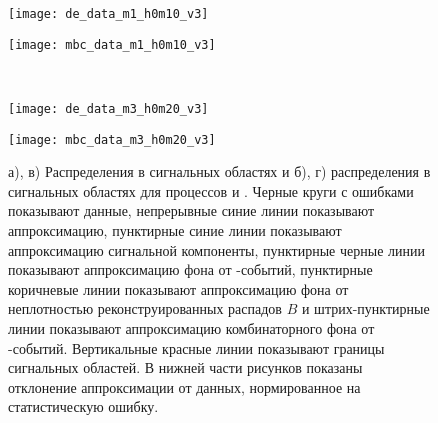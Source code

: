 \begin{figure}[H]
\begin{minipage}[b]{0.5\textwidth}
  \centering
  \texttt{[image: de\_data\_m1\_h0m10\_v3]}
  \subcaption{\bdpi: \de}
\end{minipage}
\begin{minipage}[b]{0.5\textwidth}
  \centering
  \texttt{[image: mbc\_data\_m1\_h0m10\_v3]}
  \subcaption{\bdpi: \mbc}
\end{minipage}
 \\
\begin{minipage}[b]{0.5\textwidth}
  \centering
  \texttt{[image: de\_data\_m3\_h0m20\_v3]}
  \subcaption{\bdomega: \de}
 \end{minipage}
 \begin{minipage}[b]{0.5\textwidth}
  \centering
  \texttt{[image: mbc\_data\_m3\_h0m20\_v3]}
  \subcaption{\bdomega: \mbc}
 \end{minipage}
  \caption{а), в) Распределения \de в сигнальных областях \mbc и б), г) распределения \mbc в сигнальных областях \de для процессов \bdpi и \bdomega.  Черные круги с ошибками показывают данные, непрерывные синие линии показывают аппроксимацию, пунктирные синие линии показывают аппроксимацию сигнальной компоненты, пунктирные черные линии показывают аппроксимацию фона от \qqbar-событий, пунктирные коричневые линии показывают аппроксимацию фона от неплотностью реконструированных распадов $B$ и штрих-пунктирные линии показывают аппроксимацию комбинаторного фона от \bbbar-событий. Вертикальные красные линии показывают границы сигнальных областей.  В нижней части рисунков показаны отклонение аппроксимации от данных, нормированное на статистическую ошибку.}
  \label{fig:de_mbc_main}
 \end{figure}

